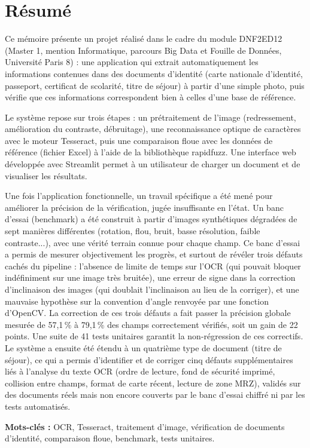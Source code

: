 \chapter*{Résumé}

Ce mémoire présente un projet réalisé dans le cadre du module DNF2ED12 (Master 1, mention Informatique, parcours Big Data et Fouille de Données, Université Paris 8) : une application qui extrait automatiquement les informations contenues dans des documents d'identité (carte nationale d'identité, passeport, certificat de scolarité, titre de séjour) à partir d'une simple photo, puis vérifie que ces informations correspondent bien à celles d'une base de référence.

Le système repose sur trois étapes : un prétraitement de l'image (redressement, amélioration du contraste, débruitage), une reconnaissance optique de caractères avec le moteur Tesseract, puis une comparaison floue avec les données de référence (fichier Excel) à l'aide de la bibliothèque rapidfuzz. Une interface web développée avec Streamlit permet à un utilisateur de charger un document et de visualiser les résultats.

Une fois l'application fonctionnelle, un travail spécifique a été mené pour améliorer la précision de la vérification, jugée insuffisante en l'état. Un banc d'essai (benchmark) a été construit à partir d'images synthétiques dégradées de sept manières différentes (rotation, flou, bruit, basse résolution, faible contraste...), avec une vérité terrain connue pour chaque champ. Ce banc d'essai a permis de mesurer objectivement les progrès, et surtout de révéler trois défauts cachés du pipeline : l'absence de limite de temps sur l'OCR (qui pouvait bloquer indéfiniment sur une image très bruitée), une erreur de signe dans la correction d'inclinaison des images (qui doublait l'inclinaison au lieu de la corriger), et une mauvaise hypothèse sur la convention d'angle renvoyée par une fonction d'OpenCV. La correction de ces trois défauts a fait passer la précision globale mesurée de 57,1\,\% à 79,1\,\% des champs correctement vérifiés, soit un gain de 22 points. Une suite de 41 tests unitaires garantit la non-régression de ces correctifs. Le système a ensuite été étendu à un quatrième type de document (titre de séjour), ce qui a permis d'identifier et de corriger cinq défauts supplémentaires liés à l'analyse du texte OCR (ordre de lecture, fond de sécurité imprimé, collision entre champs, format de carte récent, lecture de zone MRZ), validés sur des documents réels mais non encore couverts par le banc d'essai chiffré ni par les tests automatisés.

\textbf{Mots-clés :} OCR, Tesseract, traitement d'image, vérification de documents d'identité, comparaison floue, benchmark, tests unitaires.
